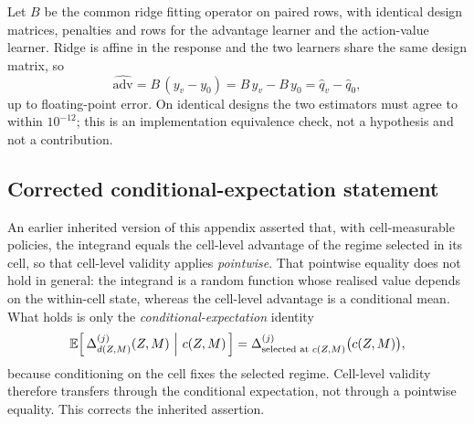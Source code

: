Let $B$ be the common ridge fitting operator on paired rows, with identical
design matrices, penalties and rows for the advantage learner and the
action-value learner.  Ridge is affine in the response and the two learners share
the same design matrix, so
\[
 \widehat{\text{adv}} = B\,(y_v-y_0)=B\,y_v-B\,y_0
 = \widehat{q}_v-\widehat{q}_0 ,
\]
up to floating-point error.  On identical designs the two estimators must agree
to within $10^{-12}$; this is an implementation equivalence check, not a
hypothesis and not a contribution.

\subsection{Corrected conditional-expectation statement}
\label{app:b-conditional}

An earlier inherited version of this appendix asserted that, with
cell-measurable policies, the integrand equals the cell-level advantage of the
regime selected in its cell, so that cell-level validity applies
\emph{pointwise}.  That pointwise equality does not hold in general: the
integrand is a random function whose realised value depends on the within-cell
state, whereas the cell-level advantage is a conditional mean.  What holds is
only the \emph{conditional-expectation} identity
\[
 \E\!\left[\,\Delta^{(j)}_{d(Z,M)}(Z,M)\ \middle|\ c(Z,M)\,\right]
 = \Delta^{(j)}_{\text{selected at }c(Z,M)}\big(c(Z,M)\big),
\]
because conditioning on the cell fixes the selected regime.  Cell-level validity
therefore transfers through the conditional expectation, not through a pointwise
equality.  This corrects the inherited assertion.
